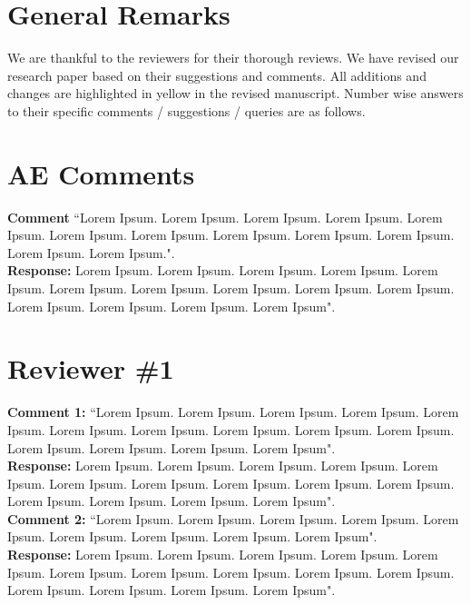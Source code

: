 \documentclass[10pt,journal,compsoc]{IEEEtran}
\begin{document}
\maketitle

\IEEEdisplaynontitleabstractindextext

\IEEEpeerreviewmaketitle

\section{General Remarks}
\label{sec:rem}

We are thankful to the reviewers for their thorough reviews.
We have revised our research paper based on their suggestions and comments.
All additions and changes are highlighted in yellow
in the revised manuscript.
Number wise answers to their specific
comments / suggestions / queries are as follows.

\section{AE Comments}
\label{sec:ae}

{\bf Comment} ``Lorem Ipsum. Lorem Ipsum. Lorem Ipsum. Lorem Ipsum. Lorem Ipsum. Lorem Ipsum. Lorem Ipsum. Lorem Ipsum. Lorem Ipsum. Lorem Ipsum. Lorem Ipsum. Lorem Ipsum.".\\

\noindent
{\bf Response:}
Lorem Ipsum. Lorem Ipsum. Lorem Ipsum. Lorem Ipsum. Lorem Ipsum. Lorem Ipsum. Lorem Ipsum. Lorem Ipsum. Lorem Ipsum. Lorem Ipsum. Lorem Ipsum. Lorem Ipsum. Lorem Ipsum. Lorem Ipsum".\\

\section{Reviewer \#1}
\label{sec:r1}

{\bf Comment 1:} ``Lorem Ipsum. Lorem Ipsum. Lorem Ipsum. Lorem Ipsum. Lorem Ipsum. Lorem Ipsum. Lorem Ipsum. Lorem Ipsum. Lorem Ipsum. Lorem Ipsum. Lorem Ipsum. Lorem Ipsum. Lorem Ipsum. Lorem Ipsum".\\

\noindent
{\bf Response:}
Lorem Ipsum. Lorem Ipsum. Lorem Ipsum. Lorem Ipsum. Lorem Ipsum. Lorem Ipsum. Lorem Ipsum. Lorem Ipsum. Lorem Ipsum. Lorem Ipsum. Lorem Ipsum. Lorem Ipsum. Lorem Ipsum. Lorem Ipsum".\\

\noindent
{\bf Comment 2:} ``Lorem Ipsum. Lorem Ipsum. Lorem Ipsum. Lorem Ipsum. Lorem Ipsum. Lorem Ipsum. Lorem Ipsum. Lorem Ipsum. Lorem Ipsum".\\

\noindent
{\bf Response:}
Lorem Ipsum. Lorem Ipsum. Lorem Ipsum. Lorem Ipsum. Lorem Ipsum. Lorem Ipsum. Lorem Ipsum. Lorem Ipsum. Lorem Ipsum. Lorem Ipsum. Lorem Ipsum. Lorem Ipsum. Lorem Ipsum. Lorem Ipsum".\\



\end{document}
